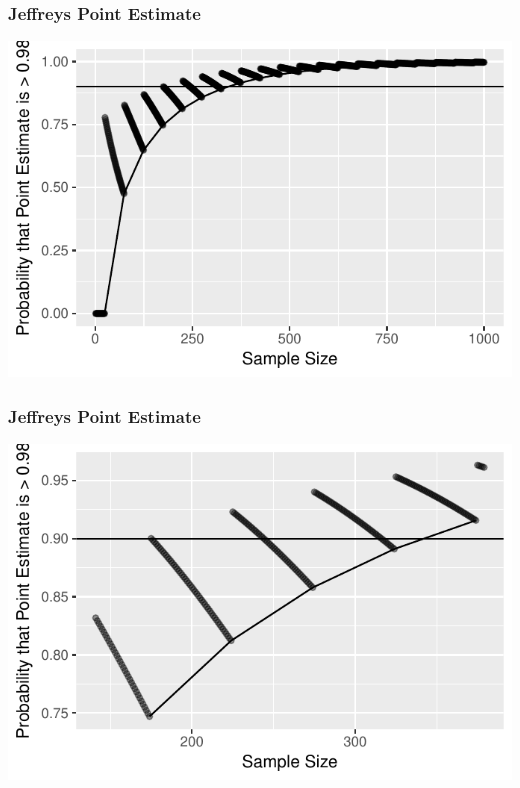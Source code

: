 \documentclass{beamer}\usepackage{knitr}
\begin{document}
\begin{frame}
\frametitle{Jeffreys Point Estimate}
\begin{knitrout}
\color{fgcolor}

{\centering \includegraphics[width=\linewidth]{figure/plot_Jeffreys_2-1} 

}



\end{knitrout}
\end{frame}

\begin{frame}
\frametitle{Jeffreys Point Estimate}
\begin{knitrout}
\color{fgcolor}

{\centering \includegraphics[width=\linewidth]{figure/plot_Jeffreys_3-1} 

}



\end{knitrout}
\end{frame}
\end{document}
